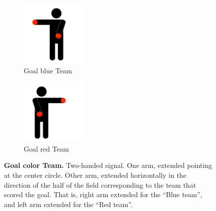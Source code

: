         \begin{figure}[ht!]
            \centering
            \begin{subfigure}{.33\textwidth}
                \centering
                \includegraphics[height=120px]{figs/referee-signals/goal.png}
                \caption{\color{blue}Goal \textlangle{}blue\textrangle{} Team}
            \end{subfigure}
            \begin{subfigure}{.33\textwidth}
                \centering
                \includegraphics[height=120px]{figs/referee-signals/goal-flipped.png}
                \caption{\color{red}Goal \textlangle{}red\textrangle{} Team}
            \end{subfigure}
            \caption{\textbf{Goal \textlangle{}color\textrangle{} Team.} Two-handed signal. One arm, extended pointing at the center circle. Other arm, extended horizontally in the direction of the half of the field corresponding to the team that scored the goal. That is, right arm extended for the ``Blue team'', and left arm extended for the ``Red team''.}
        \end{figure}

